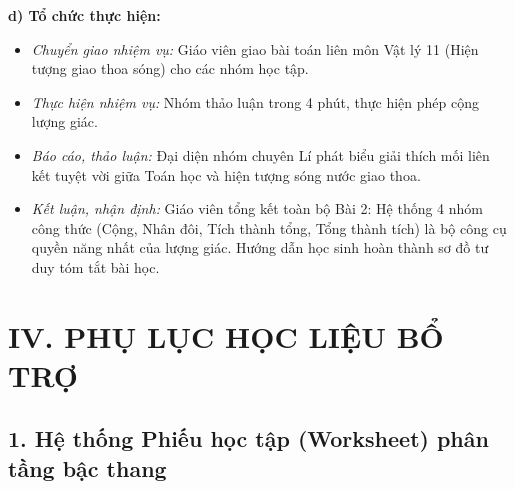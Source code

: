 \documentclass[12pt, a4paper]{article}
\begin{document}
\textbf{d) Tổ chức thực hiện:}
\begin{itemize}[leftmargin=0.6cm]
    \item \textit{Chuyển giao nhiệm vụ:} Giáo viên giao bài toán liên môn Vật lý 11 (Hiện tượng giao thoa sóng) cho các nhóm học tập.
    \item \textit{Thực hiện nhiệm vụ:} Nhóm thảo luận trong 4 phút, thực hiện phép cộng lượng giác.
    \item \textit{Báo cáo, thảo luận:} Đại diện nhóm chuyên Lí phát biểu giải thích mối liên kết tuyệt vời giữa Toán học và hiện tượng sóng nước giao thoa.
    \item \textit{Kết luận, nhận định:} Giáo viên tổng kết toàn bộ Bài 2: Hệ thống 4 nhóm công thức (Cộng, Nhân đôi, Tích thành tổng, Tổng thành tích) là bộ công cụ quyền năng nhất của lượng giác. Hướng dẫn học sinh hoàn thành sơ đồ tư duy tóm tắt bài học.
\end{itemize}

\newpage
\section*{IV. PHỤ LỤC HỌC LIỆU BỔ TRỢ}

\subsection*{1. Hệ thống Phiếu học tập (Worksheet) phân tầng bậc thang}
\end{document}
